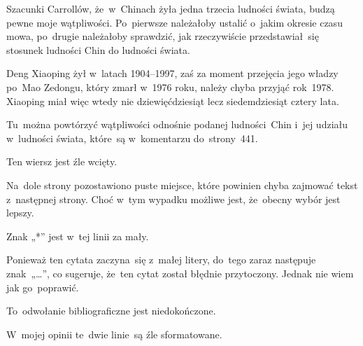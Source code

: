 \documentclass[a4paper,11pt]{article}
\begin{document}
\vspace{\spaceFour}


\start {} Szacunki Carrollów, że~w~Chinach żyła jedna
trzecia ludności świata, budzą pewne moje wątpliwości. Po~pierwsze
należałoby ustalić o~jakim okresie czasu mowa, po~drugie należałoby
sprawdzić, jak rzeczywiście przedstawiał~się stosunek ludności Chin do
ludności świata.

\vspace{\spaceFour}


\start {} Deng Xiaoping żył w~latach 1904--1997, zaś za
moment przejęcia jego władzy po~Mao Zedongu, który zmarł w~1976 roku,
należy chyba przyjąć rok~1978. Xiaoping miał więc wtedy nie
dziewięćdziesiąt lecz siedemdziesiąt cztery lata.

\vspace{\spaceFour}


\start {} Tu~można powtórzyć wątpliwości odnośnie podanej
ludności~Chin i~jej udziału w~ludności świata, które~są w~komentarzu
do~strony~441.

\vspace{\spaceFour}


\start {} Ten wiersz jest źle wcięty.

\vspace{\spaceFour}


\start {} Na~dole strony pozostawiono puste miejsce, które
powinien chyba zajmować tekst z~następnej strony. Choć w~tym wypadku
możliwe jest, że~obecny wybór jest lepszy.

\vspace{\spaceFour}


\start {} Znak „*” jest w~tej linii za mały.

\vspace{\spaceFour}


\start {} Ponieważ ten cytata zaczyna~się z~małej litery,
do~tego zaraz następuje znak~„\ldots”, co sugeruje, że~ten cytat został
błędnie przytoczony. Jednak nie wiem jak go~poprawić.

\vspace{\spaceFour}


\start {} To~odwołanie bibliograficzne jest niedokończone.

\vspace{\spaceFour}


\start {} W~mojej opinii te~dwie linie~są źle
sformatowane.
\end{document}
